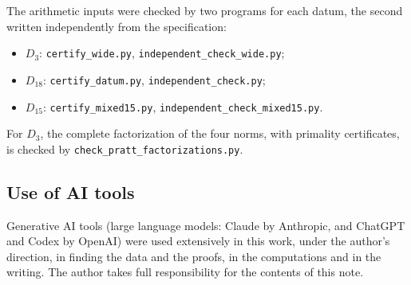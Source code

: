 \documentclass[11pt]{amsart}
\theoremstyle{remark}
\begin{document}
The arithmetic inputs were checked by two programs for each datum, the second written independently from the
specification:
\begin{itemize}
\item $D_3$: \nolinkurl{certify_wide.py}, \nolinkurl{independent_check_wide.py};
\item $D_{18}$: \nolinkurl{certify_datum.py}, \nolinkurl{independent_check.py};
\item $D_{15}$: \nolinkurl{certify_mixed15.py}, \nolinkurl{independent_check_mixed15.py}.
\end{itemize}
For $D_3$, the complete factorization of the four norms, with primality certificates, is checked by
\nolinkurl{check_pratt_factorizations.py}.

\subsection*{Use of AI tools}
Generative AI tools (large language models: \mbox{Claude} by \mbox{Anthropic}, and \mbox{ChatGPT} and \mbox{Codex} by
\mbox{OpenAI}) were used extensively in this work, under the author's direction, in finding the data and the proofs,
in the computations and in the writing. The author takes full responsibility for the contents of this note.
\end{document}
